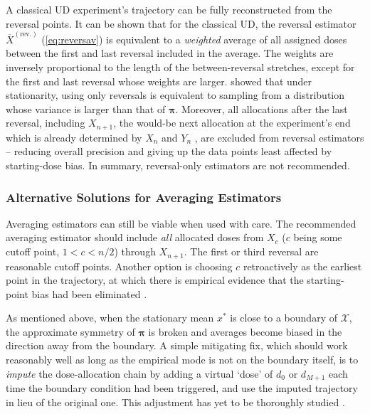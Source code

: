 A classical UD experiment's trajectory can be fully reconstructed from the reversal points. It can be shown that for the classical UD, the reversal estimator $\overline{X}^\mathrm{(rev.)}$ (\ref{eq:reversav}) is equivalent to a \emph{weighted} average of all assigned doses between the first and last reversal included in the average. The weights are inversely proportional to the length of the between-reversal stretches, except for the first and last reversal whose weights are larger. \cite{Oron07} showed that under stationarity, using only reversals is equivalent to sampling from a distribution whose variance is larger than that of $\boldsymbol{\pi}$. Moreover, all allocations after the last reversal, including $X_{n+1}$, the would-be next allocation at the experiment's end which is already determined by $X_n$ and $Y_n$ \citep{BrownleeEtAl53}, are excluded from reversal estimators -- reducing overall precision and giving up the data points least affected by starting-dose bias. In summary, reversal-only estimators are not recommended.

\subsubsection{Alternative Solutions for Averaging Estimators}

Averaging estimators can still be viable when used with care. The recommended averaging estimator should include \emph{all} allocated doses from $X_c$ ($c$ being some cutoff point, $1<c<n/2$) through $X_{n+1}$. The first or third reversal are reasonable cutoff points. Another option is choosing $c$ retroactively as the earliest point in the trajectory, at which there is empirical evidence that the starting-point bias had been eliminated \citep[Section~3.3]{Oron07}.

As mentioned above, when the stationary mean $x^*$ is close to a boundary of $\mathcal{X}$, the approximate symmetry of $\boldsymbol{\pi}$ is broken and averages become biased in the direction away from the boundary. A simple mitigating fix, which should work reasonably well as long as the empirical mode is not on the boundary itself, is to \emph{impute} the dose-allocation chain by adding a virtual `dose' of $d_0$ or $d_{M+1}$ each time the boundary condition had been triggered, and use the imputed trajectory in lieu of the original one. This adjustment has yet to be thoroughly studied \citep[Section~3.3]{Oron07}.

